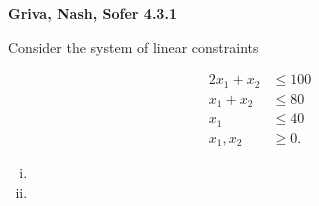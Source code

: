\textbf{Griva, Nash, Sofer 4.3.1}

Consider the system of linear constraints

\begin{align*}
  2x_1 + x_2 &\leq 100 \\
   x_1 + x_2 &\leq 80 \\
         x_1 &\leq 40 \\
    x_1, x_2 &\geq 0.
\end{align*}

\begin{enumerate}[(i)]
  \item 
  \pagebreak
  \item 
\end{enumerate}